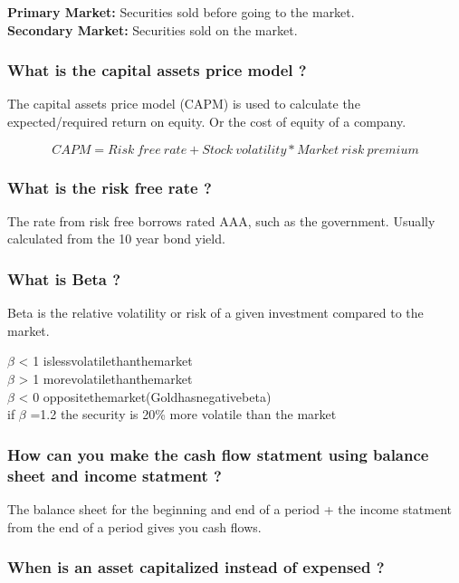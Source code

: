 \documentclass[11pt]{scrartcl} %
\begin{document}
\textbf{Primary Market:} Securities sold before going to the market. \\

\textbf{Secondary Market:} Securities sold on the market. \\

\subsubsection{What is the capital assets price model ?}

The capital assets price model (CAPM) is used to calculate the expected/required return on equity. Or the cost of equity of a company.

\[ CAPM = Risk\:free\:rate + Stock\:volatility*Market\:risk\:premium \]

\subsubsection{What is the risk free rate ?}

The rate from risk free borrows rated AAA, such as the government. Usually calculated from the 10 year bond yield.

\subsubsection{What is Beta ?}

Beta is the relative volatility or risk of a given investment compared to the market.

$\beta$ < 1 is\:less\:volatile\:than\:the\:market \\
$\beta$ > 1 more\:volatile\:than\:the\:market \\
$\beta$ < 0 opposite\:the\:market\:(Gold\:has\:negative\:beta) \\

if $\beta$ =1.2 the security is 20\% more volatile than the market

\subsubsection{How can you make the cash flow statment using balance sheet and income statment ?}

The balance sheet for the beginning and end of a period + the income statment from the end of a period gives you cash flows.

\subsubsection{When is an asset capitalized instead of expensed ?}
\end{document}
